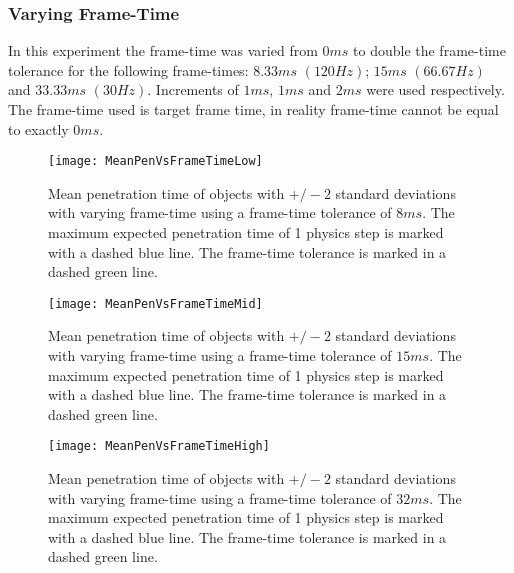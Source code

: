 \subsubsection{Varying Frame-Time}

In this experiment the frame-time was varied from $0ms$ to double the frame-time tolerance for the following frame-times: $8.33ms$ $(120Hz)$; $15ms$ $(66.67Hz)$ and $33.33ms$ $(30Hz)$. Increments of $1ms$, $1ms$ and $2ms$ were used respectively. The frame-time used is target frame time, in reality frame-time cannot be equal to exactly $0ms$.

\begin{figure}[t]
	\centering
	\texttt{[image: MeanPenVsFrameTimeLow]}
	\caption{Mean penetration time of objects with $+/-2$ standard deviations with varying frame-time using a frame-time tolerance of $8ms$. The maximum expected penetration time of 1 physics step is marked with a dashed blue line. The frame-time tolerance is marked in a dashed green line.}
	\label{fig_CollisionsPenVsFrameTimeLow}
\end{figure}
\begin{figure}[t]
	\centering
	\texttt{[image: MeanPenVsFrameTimeMid]}
	\caption{Mean penetration time of objects with $+/-2$ standard deviations with varying frame-time using a frame-time tolerance of $15ms$. The maximum expected penetration time of 1 physics step is marked with a dashed blue line. The frame-time tolerance is marked in a dashed green line.}
	\label{fig_CollisionsPenVsFrameTimeMid}
\end{figure}
\begin{figure}[t]
	\centering
	\texttt{[image: MeanPenVsFrameTimeHigh]}
	\caption{Mean penetration time of objects with $+/-2$ standard deviations with varying frame-time using a frame-time tolerance of $32ms$. The maximum expected penetration time of 1 physics step is marked with a dashed blue line. The frame-time tolerance is marked in a dashed green line.}
	\label{fig_CollisionsPenVsFrameTimeHigh}
\end{figure}

